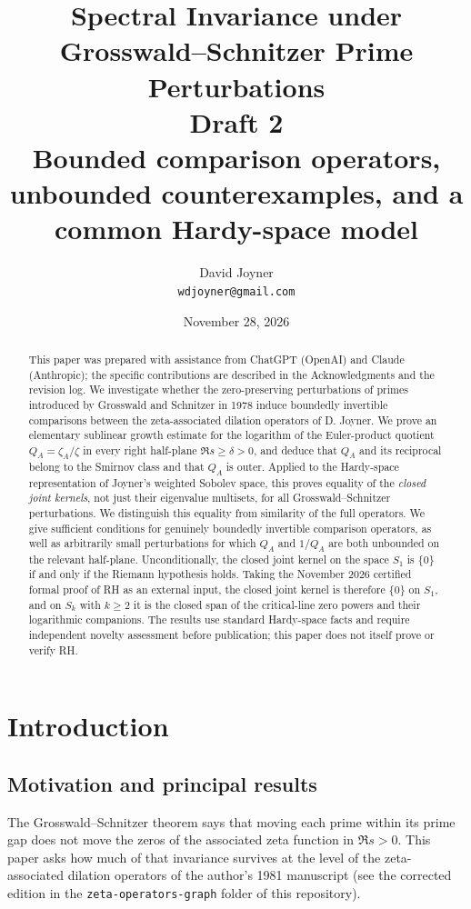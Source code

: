 \documentclass[12pt,letterpaper]{article}
\title{Spectral Invariance under Grosswald--Schnitzer Prime Perturbations\\[0.4em]
\large Draft 2\\[0.25em]
\normalsize Bounded comparison operators, unbounded counterexamples, and a common Hardy-space model}
\author{David Joyner\\\texttt{wdjoyner@gmail.com}}
\date{November 28, 2026}
\theoremstyle{remark}
\numberwithin{equation}{section}
\begin{document}
\maketitle
\begin{abstract}
This paper was prepared with assistance from ChatGPT (OpenAI) and Claude (Anthropic); the specific contributions are described in the Acknowledgments and the revision log.
We investigate whether the zero-preserving perturbations of primes introduced by Grosswald and Schnitzer in 1978 induce boundedly invertible comparisons between the zeta-associated dilation operators of D. Joyner. We prove an elementary sublinear growth estimate for the logarithm of the Euler-product quotient $Q_A=\zeta_A/\zeta$ in every right half-plane $\Re s\ge\delta>0$, and deduce that $Q_A$ and its reciprocal belong to the Smirnov class and that $Q_A$ is outer. Applied to the Hardy-space representation of Joyner's weighted Sobolev space, this proves equality of the \emph{closed joint kernels}, not just their eigenvalue multisets, for all Grosswald--Schnitzer perturbations. We distinguish this equality from similarity of the full operators. We give sufficient conditions for genuinely boundedly invertible comparison operators, as well as arbitrarily small perturbations for which $Q_A$ and $1/Q_A$ are both unbounded on the relevant half-plane. Unconditionally, the closed joint kernel on the space $S_1$ is $\{0\}$ if and only if the Riemann hypothesis holds. Taking the November 2026 certified formal proof of RH as an external input, the closed joint kernel is therefore $\{0\}$ on $S_1$, and on $S_k$ with $k\ge2$ it is the closed span of the critical-line zero powers and their logarithmic companions. The results use standard Hardy-space facts and require independent novelty assessment before publication; this paper does not itself prove or verify RH.
\end{abstract}

\clearpage
\setcounter{tocdepth}{2}
\tableofcontents
\clearpage

\section{Introduction}
\subsection{Motivation and principal results}
The Grosswald--Schnitzer theorem says that moving each prime within
its prime gap does not move the zeros of the associated zeta function
in $\Re s>0$.  This paper asks how much of that invariance survives
at the level of the zeta-associated dilation operators of the
author's 1981 manuscript (see the corrected edition in the
\texttt{zeta-operators-graph} folder of this repository).
\end{document}
